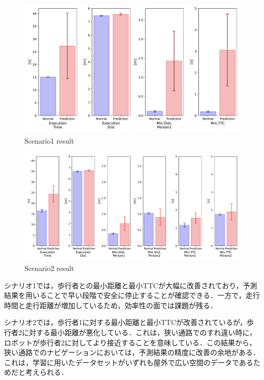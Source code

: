 \begin{figure}[H]
  \centering
 \includegraphics[keepaspectratio, scale=0.53]
      {images/scenario1_result.pdf}
\caption{Scenario1 result}
 \label{Fig:scenario1-result}
\end{figure} 

\begin{figure}[H]
  \centering
 \includegraphics[keepaspectratio, scale=0.44]
      {images/scenario2_result.pdf}
\caption{Scenario2 result}
 \label{Fig:scenario2-result}
\end{figure} 

シナリオ1では，歩行者との最小距離と最小TTCが大幅に改善されており，予測結果を用いることで早い段階で安全に停止することが確認できる．一方で，走行時間と走行距離が増加しているため，効率性の面では課題が残る．

シナリオ2では，歩行者1に対する最小距離と最小TTCが改善されているが，歩行者2に対する最小距離が悪化している．これは，狭い通路でのすれ違い時に，ロボットが歩行者2に対してより接近することを意味している．この結果から，狭い通路でのナビゲーションにおいては，予測結果の精度に改善の余地がある．これは，学習に用いたデータセットがいずれも屋外で広い空間のデータであるためだと考えられる．

